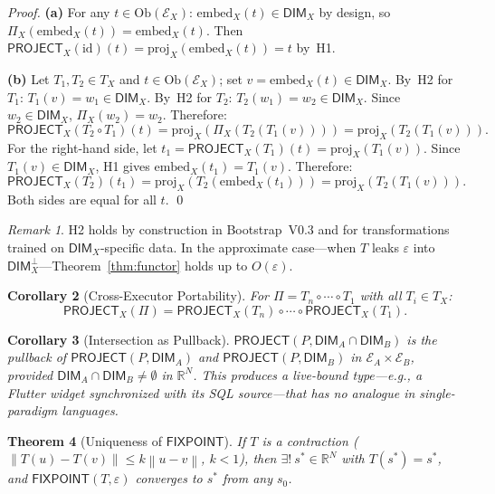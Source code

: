 \documentclass[10pt,twocolumn]{article}
\theoremstyle{plain}
\newtheorem{theorem}{Theorem}[section]
\newtheorem{corollary}[theorem]{Corollary}
\theoremstyle{definition}
\theoremstyle{remark}
\newtheorem{remark}[theorem]{Remark}
\newcommand{\RR}{\mathbb{R}}
\newcommand{\Fixpoint}{\mathsf{FIXPOINT}}
\newcommand{\Project}{\mathsf{PROJECT}}
\newcommand{\DimX}{\mathsf{DIM}_X}
\newcommand{\ProxX}{\Pi_X}
\newcommand{\EmbX}{\mathrm{embed}_X}
\newcommand{\ProjX}{\mathrm{proj}_X}
\newcommand{\Ob}{\mathrm{Ob}}
\newcommand{\norm}[1]{\left\|#1\right\|}
\begin{document}
\begin{proof}
\textbf{(a)} For any $t \in \Ob(\mathcal{E}_X)$: $\EmbX(t) \in \DimX$ by
design, so $\ProxX(\EmbX(t)) = \EmbX(t)$. Then $\Project_X(\mathrm{id})(t) =
\ProjX(\EmbX(t)) = t$ by~H1.

\textbf{(b)} Let $T_1, T_2 \in T_X$ and $t \in \Ob(\mathcal{E}_X)$; set
$v = \EmbX(t) \in \DimX$. By~H2 for $T_1$: $T_1(v) = w_1 \in \DimX$. By~H2
for $T_2$: $T_2(w_1) = w_2 \in \DimX$. Since $w_2 \in \DimX$, $\ProxX(w_2) =
w_2$. Therefore:
\[
  \Project_X(T_2 \circ T_1)(t) = \ProjX(\ProxX(T_2(T_1(v)))) = \ProjX(T_2(T_1(v))).
\]
For the right-hand side, let $t_1 = \Project_X(T_1)(t) = \ProjX(T_1(v))$.
Since $T_1(v) \in \DimX$, H1 gives $\EmbX(t_1) = T_1(v)$. Therefore:
\[
  \Project_X(T_2)(t_1) = \ProjX(T_2(\EmbX(t_1))) = \ProjX(T_2(T_1(v))).
\]
Both sides are equal for all $t$. \qed
\end{proof}

\begin{remark}
H2 holds by construction in Bootstrap~V0.3 and for transformations trained on
$\DimX$-specific data. In the approximate case---when $T$ leaks $\varepsilon$
into $\DimX^\perp$---Theorem~\ref{thm:functor} holds up to $O(\varepsilon)$.
\end{remark}

\begin{corollary}[Cross-Executor Portability]
\label{cor:portability}
For $\Pi = T_n \circ \cdots \circ T_1$ with all $T_i \in T_X$:
\[
  \Project_X(\Pi) = \Project_X(T_n) \circ \cdots \circ \Project_X(T_1).
\]
\end{corollary}

\begin{corollary}[Intersection as Pullback]
\label{cor:pullback}
$\Project(P, \mathsf{DIM}_A \cap \mathsf{DIM}_B)$ is the pullback of
$\Project(P, \mathsf{DIM}_A)$ and $\Project(P, \mathsf{DIM}_B)$ in
$\mathcal{E}_A \times \mathcal{E}_B$, provided $\mathsf{DIM}_A \cap
\mathsf{DIM}_B \neq \emptyset$ in $\RR^N$. This produces a live-bound
type---e.g., a Flutter widget synchronized with its SQL source---that has no
analogue in single-paradigm languages.
\end{corollary}

\begin{theorem}[Uniqueness of $\Fixpoint$]
\label{thm:fixpoint}
If $T$ is a contraction ($\norm{T(u)-T(v)} \leq k\norm{u-v}$, $k < 1$), then
$\exists!\ s^* \in \RR^N$ with $T(s^*) = s^*$, and $\Fixpoint(T, \varepsilon)$
converges to $s^*$ from any $s_0$.
\end{theorem}
\end{document}
